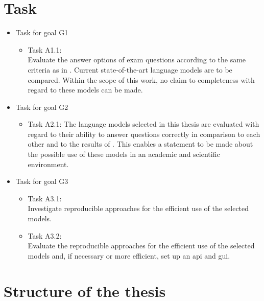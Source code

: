 \section{Task}
\begin{itemize}
  \item Task for goal G1
        \begin{itemize}
          \item Task A1.1:\\Evaluate the answer options of exam questions according to the same criteria as in \citet{Paul_Keller}.
          Current state-of-the-art language models are to be compared. Within the scope of this work, no claim to completeness with regard to these models can be made. 
          \end{itemize}
 \item Task for goal G2
    \begin{itemize}
          \item Task A2.1: The language models selected in this thesis are evaluated with regard to their ability to answer questions correctly in comparison to each other and to the results of \citet{Paul_Keller}.\@
          This enables a statement to be made about the possible use of these models in an academic and scientific environment.
        \end{itemize}
  \item Task for goal G3
        \begin{itemize}
          \item Task A3.1:\\Investigate reproducible approaches for the efficient use of the selected models.
          \item Task A3.2:\\Evaluate the reproducible approaches for the efficient use of the selected models and, if necessary or more efficient, set up an \ac{api} and \ac{gui}.
        \end{itemize}
\end{itemize}



\section{Structure of the thesis}

